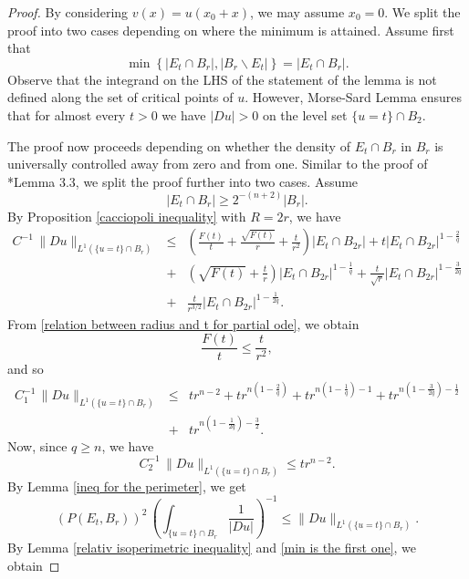 \documentclass[12pt,a4paper]{amsart}
\numberwithin{equation}{section} %
\theoremstyle{definition}
\theoremstyle{remark}
\begin{document}
\begin{proof}
By considering $v(x) = u(x_0 + x)$, we may assume $x_0 = 0$. We split the proof into two cases depending on where the minimum is attained. Assume first that
\begin{equation}\label{min is the first one}
    \min \left\{|E_t \cap B_r|, |B_r \backslash E_t| \right\} = |E_t \cap B_r|. 
\end{equation}
Observe that the integrand on the LHS of the statement of the lemma is not defined along the set of critical points of $u$. However, Morse-Sard Lemma ensures that for almost every $t>0$ we have $|Du|>0$ on the level set $\{u=t\}\cap B_2$.

The proof now proceeds depending on whether the density of $E_t \cap B_r$ in $B_r$ is universally controlled away from zero and from one. Similar to the proof of \cite{VJ1}*{Lemma 3.3}, we split the proof further into two cases. Assume
\begin{equation}\label{first case}
    |E_t \cap B_r| \geq 2^{-(n+2)}|B_r|.
\end{equation}
By Proposition \ref{cacciopoli inequality} with $R=2r$, we have
\begin{eqnarray*}
    C^{-1}\,\|Du\|_{L^1(\{u=t \}  \cap B_r)}  &\leq&  \left(\frac{F(t)}{t}+\frac{\sqrt{F(t)}}{r} +\frac{t}{r^2} \right)|E_t \cap B_{2r}|+ t|E_t \cap B_{2r}|^{1-\frac{2}{q}}\\
    & + &  \left(\sqrt{F(t)} +\frac{t}{r} \right)|E_t \cap B_{2r}|^{1 - \frac{1}{q}} +  \frac{t}{\sqrt{r}}|E_t \cap B_{2r}|^{1 - \frac{3}{2q}}\\
    & + & \frac{t}{r^{3/2}}|E_t \cap B_{2r}|^{1 - \frac{1}{2q}}.
\end{eqnarray*}
From \eqref{relation between radius and t for partial ode}, we obtain
$$
    \frac{F(t)}{t} \leq \frac{t}{r^2},
$$
and so
\begin{eqnarray*}
    C_1^{-1}\,\|Du\|_{L^1(\{u=t \}  \cap B_r)}  & \leq &  tr^{n-2} + tr^{n\left(1-\frac{2}{q}\right)}+tr^{n\left(1-\frac{1}{q}\right) - 1}+ tr^{n\left(1-\frac{3}{2q}\right) - \frac{1}{2}}\\
    &+& tr^{n\left(1-\frac{1}{2q}\right) - \frac{3}{2}}.
\end{eqnarray*}
Now, since  $q \geq n$, we have
$$
    C_2^{-1}\,\|Du\|_{L^1(\{u=t \}  \cap B_r)} \leq tr^{n-2}.
$$
By Lemma \ref{ineq for the perimeter}, we get
$$
   (P(E_t,B_r))^2\, \left(\int_{\{u=t\}\cap B_r}\frac{1}{|Du|} \right)^{-1} \leq \|Du\|_{L^1(\{u=t \}\cap B_r)}. 
$$
By Lemma \ref{relativ isoperimetric inequality} and \eqref{min is the first one}, we obtain

\end{proof}
\end{document}
